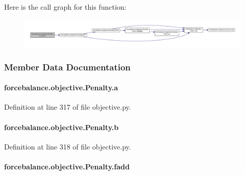 Here is the call graph for this function\-:
\nopagebreak
\begin{figure}[H]
\begin{center}
\leavevmode
\includegraphics[width=350pt]{classforcebalance_1_1objective_1_1Penalty_ab59d5beafbab0918b7c3e0c61ece41a3_cgraph}
\end{center}
\end{figure}




\subsubsection{Member Data Documentation}
\hypertarget{classforcebalance_1_1objective_1_1Penalty_abab984da8a8f62adbd1decbaf56ac2fa}{
\paragraph[{a}]{\setlength{\rightskip}{0pt plus 5cm}forcebalance.\-objective.\-Penalty.\-a}}\label{classforcebalance_1_1objective_1_1Penalty_abab984da8a8f62adbd1decbaf56ac2fa}


Definition at line 317 of file objective.\-py.

\hypertarget{classforcebalance_1_1objective_1_1Penalty_a0d9da5669d74dfd54a2fc639424e37b6}{
\paragraph[{b}]{\setlength{\rightskip}{0pt plus 5cm}forcebalance.\-objective.\-Penalty.\-b}}\label{classforcebalance_1_1objective_1_1Penalty_a0d9da5669d74dfd54a2fc639424e37b6}


Definition at line 318 of file objective.\-py.

\hypertarget{classforcebalance_1_1objective_1_1Penalty_a8c93cd0cfa455a54f957a061b5f7ac50}{
\paragraph[{fadd}]{\setlength{\rightskip}{0pt plus 5cm}forcebalance.\-objective.\-Penalty.\-fadd}}\label{classforcebalance_1_1objective_1_1Penalty_a8c93cd0cfa455a54f957a061b5f7ac50}


